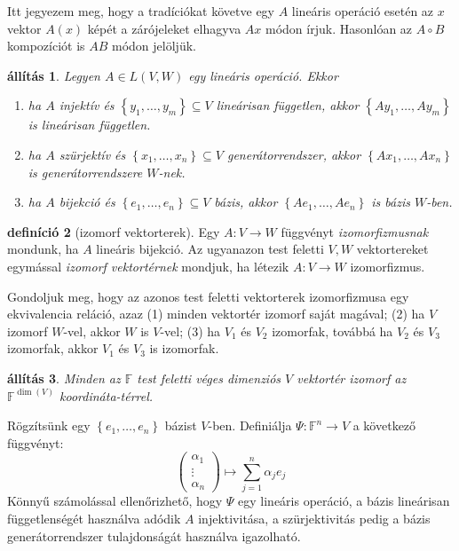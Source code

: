 \documentclass[a4paper, showtrims]{memoir}
\makeatletter
\renewenvironment{proof}[1][\proofname]
    {\par\pushQED{\qed}%
    \normalfont \topsep6\p@\@plus6\p@\relax
    \trivlist
    \item[\hskip\labelsep
        \itshape
    #1\@addpunct{:}]\ignorespaces}
    {\popQED\endtrivlist\@endpefalse}
\theoremstyle{plain}
\newtheorem{proposition}{állítás}[chapter]
\theoremstyle{remark}
\theoremstyle{definition}
\newtheorem{definition}[proposition]{definíció}
\makeatother
\begin{document}
Itt jegyezem meg, hogy a tradíciókat követve egy $A$ lineáris operáció esetén az $x$ vektor
$A\left( x \right)$ képét a zárójeleket elhagyva $Ax$ módon írjuk.
Hasonlóan az $A\circ B$ kompozíciót is $AB$ módon jelöljük.

\begin{proposition}
	Legyen $A\in L\left( V,W \right)$ egy lineáris operáció.
	Ekkor
	\begin{enumerate}
		\item ha $A$ injektív és $\left\{ y_1,\ldots,y_m \right\}\subseteq V$
		      lineárisan független,
		      akkor
		      $\left\{ Ay_1,\ldots,Ay_m \right\}$ is lineárisan független.
		\item ha $A$ szürjektív és $\left\{ x_1,\ldots,x_n \right\}\subseteq V$
		      generátorrendszer,
		      akkor
		      $\left\{ Ax_1,\ldots,Ax_n \right\}$ is generátorrendszere $W$-nek.
		\item ha $A$ bijekció és $\left\{ e_1,\ldots,e_n \right\}\subseteq V$
		      bázis,
		      akkor
		      $\left\{ Ae_1,\ldots,Ae_n \right\}$ is bázis $W$-ben.
		      \qedhere
	\end{enumerate}
\end{proposition}
\begin{definition}[izomorf vektorterek]
	Egy $A:V\to W$ függvényt \emph{izomorfizmusnak} mondunk,
	ha $A$ lineáris bijekció.
	Az ugyanazon test feletti $V,W$ vektortereket egymással \emph{izomorf vektortérnek} mondjuk,
	ha létezik $A:V\to W$ izomorfizmus.
\end{definition}
Gondoljuk meg, hogy az azonos test feletti vektorterek izomorfizmusa egy ekvivalencia reláció,
azaz (1) minden vektortér izomorf saját magával; (2) ha $V$ izomorf $W$-vel,
akkor $W$ is $V$-vel; (3) ha $V_1$ és $V_2$ izomorfak, továbbá ha $V_2$ és $V_3$ izomorfak, akkor
$V_1$ és $V_3$ is izomorfak.
\begin{proposition}
	Minden az $\mathbb{F}$ test feletti véges dimenziós $V$ vektortér izomorf az $\mathbb{F}^{\dim(V)}$
	koordináta-térrel.
\end{proposition}
\begin{proof}
	Rögzítsünk egy $\left\{ e_1,\ldots,e_n \right\}$ bázist $V$-ben.
	Definiálja $\Psi:\mathbb{F}^n\to V$ a következő függvényt:
	\[
		\begin{pmatrix}
			\alpha_1 \\ \vdots\\ \alpha_n
		\end{pmatrix}
		\mapsto\sum_{j=1}^n\alpha_je_j
	\]
	Könnyű számolással ellenőrizhető,
	hogy $\Psi$ egy lineáris operáció,
	a bázis lineárisan függetlenségét használva adódik $A$ injektivitása,
	a szürjektivitás pedig a bázis generátorrendszer tulajdonságát használva igazolható.
\end{proof}
\end{document}
